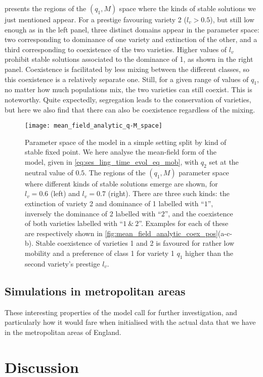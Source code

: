 \documentclass[../thesis.tex]{subfiles}
\begin{document}
 presents the regions of the $(q_1, M)$ space
where the kinds of stable solutions we just mentioned appear. For a prestige favouring
variety 2 ($l_v > 0.5$), but still low enough as in the left panel, three distinct
domains appear in the parameter space: two corresponding to dominance of one variety and
extinction of the other, and a third corresponding to coexistence of the two varieties.
Higher values of $l_v$ prohibit stable solutions associated to the dominance of 1, as
shown in the right panel. Coexistence is facilitated by less mixing between the
different classes, so this coexistence is a relatively separate one. Still, for a given
range of values of $q_1$, no matter how much populations mix, the two varieties can
still coexist. This is noteworthy. Quite expectedly, segregation leads to the
conservation of varieties, but here we also find that there can also be coexistence
regardless of the mixing.
\begin{figure}
  \centering
  \texttt{[image: mean\_field\_analytic\_q-M\_space]}
  \caption{Parameter space of the model in a simple setting split by kind of stable
  fixed point. We here analyse the mean-field form of the model, given in
  \cref{eq:ses_ling_time_evol_eq_mob}, with $q_2$ set at the neutral value of $0.5$. The
  regions of the $(q_1, M)$ parameter space where different kinds of stable solutions
  emerge are shown, for $l_v = 0.6$ (left) and $l_v = 0.7$ (right). There are three such
  kinds: the extinction of variety 2 and dominance of 1 labelled with ``$1$'', inversely
  the dominance of 2 labelled with ``$2$'', and the coexistence of both varieties
  labelled with ``$1~\&~2$''. Examples for each of these are respectively shown in
  \cref{fig:mean_field_analytic_coex_pos}(a-c-b). Stable coexistence of varieties 1 and
  2 is favoured for rather low mobility and a preference of class 1 for variety 1 $q_1$
  higher than the second variety's prestige $l_v$.}
  \label{fig:mean_field_analytic_q-M_space}
\end{figure}



\subsection{Simulations in metropolitan areas}
These interesting properties of the model call for further investigation, and
particularly how it would fare when initialised with the actual data that we have in the
metropolitan areas of England.


\section{Discussion}
\end{document}
